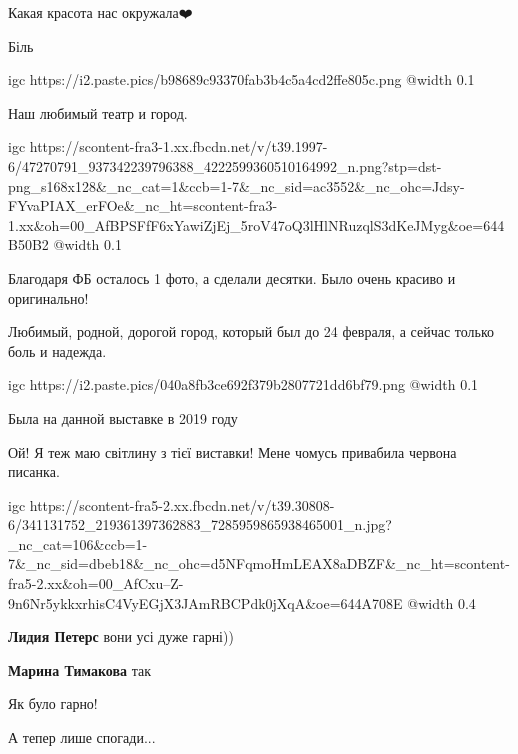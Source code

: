 Какая красота нас окружала❤️


Біль

\ifcmt
  igc https://i2.paste.pics/b98689c93370fab3b4c5a4cd2ffe805c.png
	@width 0.1
\fi


Наш любимый театр и город.

\ifcmt
  igc https://scontent-fra3-1.xx.fbcdn.net/v/t39.1997-6/47270791_937342239796388_4222599360510164992_n.png?stp=dst-png_s168x128&_nc_cat=1&ccb=1-7&_nc_sid=ac3552&_nc_ohc=Jdsy-FYvaPIAX_erFOe&_nc_ht=scontent-fra3-1.xx&oh=00_AfBPSFfF6xYawiZjEj_5roV47oQ3lHlNRuzqlS3dKeJMyg&oe=644B50B2
	@width 0.1
\fi


Благодаря ФБ осталось 1 фото, а сделали десятки. Было очень красиво и оригинально!


Любимый, родной, дорогой город, который был до 24 февраля, а сейчас только боль и надежда.


\ifcmt
  igc https://i2.paste.pics/040a8fb3ce692f379b2807721dd6bf79.png
	@width 0.1
\fi


Была на данной выставке в 2019 году


Ой! Я теж маю світлину з тієї виставки! Мене чомусь привабила червона писанка.

\ifcmt
  igc https://scontent-fra5-2.xx.fbcdn.net/v/t39.30808-6/341131752_219361397362883_7285959865938465001_n.jpg?_nc_cat=106&ccb=1-7&_nc_sid=dbeb18&_nc_ohc=d5NFqmoHmLEAX8aDBZF&_nc_ht=scontent-fra5-2.xx&oh=00_AfCxu--Z-9n6Nr5ykkxrhisC4VyEGjX3JAmRBCPdk0jXqA&oe=644A708E
	@width 0.4
\fi

\begin{itemize} %
\textbf{Лидия Петерс} вони усі дуже гарні))

\textbf{Марина Тимакова} так
\end{itemize} %


Як було гарно!


А тепер лише спогади...
